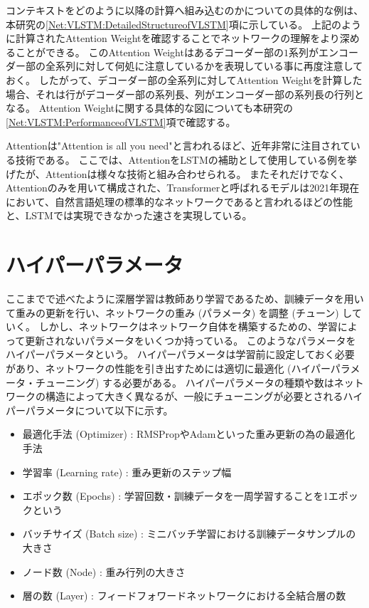 コンテキストをどのように以降の計算へ組み込むのかについての具体的な例は、本研究の\ref{Net:VLSTM:DetailedStructureofVLSTM}項に示している。
上記のように計算されたAttention Weightを確認することでネットワークの理解をより深めることができる。
このAttention Weightはあるデコーダー部の$1$系列がエンコーダー部の全系列に対して何処に注意しているかを表現している事に再度注意しておく。
したがって、デコーダー部の全系列に対してAttention Weightを計算した場合、それは行がデコーダー部の系列長、列がエンコーダー部の系列長の行列となる。
Attention Weightに関する具体的な図についても本研究の\ref{Net:VLSTM:PerformanceofVLSTM}項で確認する。

Attentionは"Attention is all you need\cite{AttentionIsAllYouNeed}"と言われるほど、近年非常に注目されている技術である。
ここでは、AttentionをLSTMの補助として使用している例を挙げたが、Attentionは様々な技術と組み合わせられる。
またそれだけでなく、Attentionのみを用いて構成された、Transformerと呼ばれるモデルは2021年現在において、自然言語処理の標準的なネットワークであると言われるほどの性能と、LSTMでは実現できなかった速さを実現している。


\section{ハイパーパラメータ} \label{DL:HyperParameter}

ここまでで述べたように深層学習は教師あり学習であるため、訓練データを用いて重みの更新を行い、ネットワークの重み (パラメータ) を調整 (チューン) していく。
しかし、ネットワークはネットワーク自体を構築するための、学習によって更新されないパラメータをいくつか持っている。
このようなパラメータをハイパーパラメータという。
ハイパーパラメータは学習前に設定しておく必要があり、ネットワークの性能を引き出すためには適切に最適化 (ハイパーパラメータ・チューニング) する必要がある。
ハイパーパラメータの種類や数はネットワークの構造によって大きく異なるが、一般にチューニングが必要とされるハイパーパラメータについて以下に示す。

\begin{itemize}
  \item 最適化手法 (Optimizer) : RMSPropやAdamといった重み更新の為の最適化手法
  \item 学習率 (Learning rate) : 重み更新のステップ幅
  \item エポック数 (Epochs) : 学習回数・訓練データを一周学習することを1エポックという
  \item バッチサイズ (Batch size) : ミニバッチ学習における訓練データサンプルの大きさ
  \item ノード数 (Node) : 重み行列の大きさ
  \item 層の数 (Layer) : フィードフォワードネットワークにおける全結合層の数
\end{itemize}


